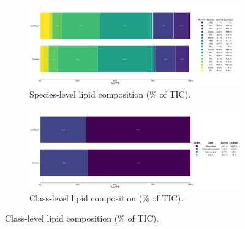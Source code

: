 \documentclass[10pt,letterpaper]{article}
\begin{document}
\begin{figure}[htp]
  \centering

  \begin{subfigure}[t]{\textwidth}
    \centering
    \includegraphics[width=\textwidth]{fig/main/Fig1a_lipid_species.png}
    \caption{Species‐level lipid composition (\% of TIC).}
    \label{fig:1A_lipid_species}
  \end{subfigure}

  \vspace{1em}

  \begin{subfigure}[t]{\textwidth}
    \centering
    \includegraphics[width=\textwidth]{fig/main/Fig1b_lipid_class.png}
    \caption{Class‐level lipid composition (\% of TIC).}
    \label{fig:1B_lipid_class}
  \end{subfigure}

  \vspace{1em}


\end{figure}
\end{document}

